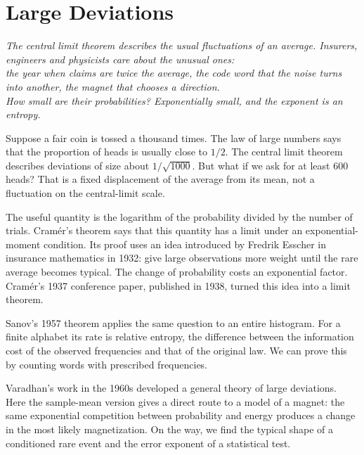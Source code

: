 \chapter{Large Deviations}
\begin{center}\itshape
The central limit theorem describes the usual fluctuations of an average. Insurers, engineers and physicists care about the unusual ones:\\
the year when claims are twice the average, the code word that the noise turns into another, the magnet that chooses a direction.\\
How small are their probabilities? Exponentially small, and the exponent is an entropy.
\end{center}

Suppose a fair coin is tossed a thousand times. The law of large numbers says that the proportion of heads is usually close to $1/2$. The central limit theorem describes deviations of size about $1/\sqrt{1000}$. But what if we ask for at least $600$ heads? That is a fixed displacement of the average from its mean, not a fluctuation on the central-limit scale.

The useful quantity is the logarithm of the probability divided by the number of trials. Cram\'er's theorem says that this quantity has a limit under an exponential-moment condition. Its proof uses an idea introduced by Fredrik Esscher in insurance mathematics in 1932: give large observations more weight until the rare average becomes typical. The change of probability costs an exponential factor. Cram\'er's 1937 conference paper, published in 1938, turned this idea into a limit theorem.

Sanov's 1957 theorem applies the same question to an entire histogram. For a finite alphabet its rate is relative entropy, the difference between the information cost of the observed frequencies and that of the original law. We can prove this by counting words with prescribed frequencies.

Varadhan's work in the 1960s developed a general theory of large deviations. Here the sample-mean version gives a direct route to a model of a magnet: the same exponential competition between probability and energy produces a change in the most likely magnetization. On the way, we find the typical shape of a conditioned rare event and the error exponent of a statistical test.


